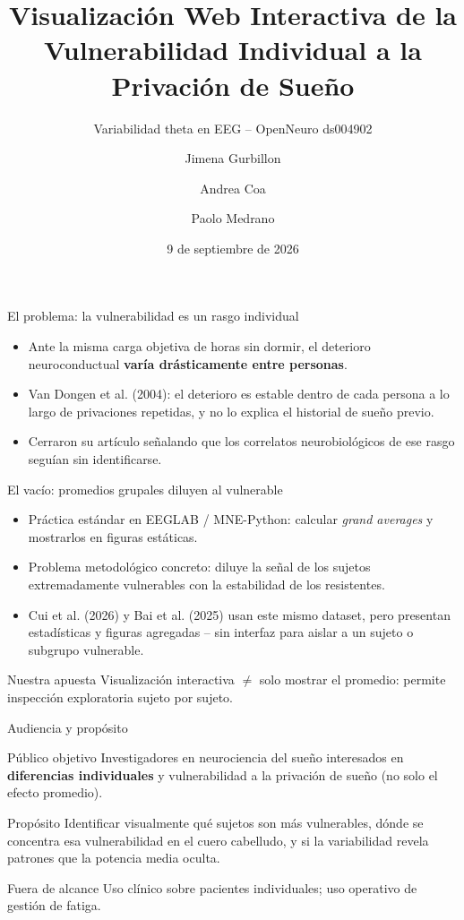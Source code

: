 \documentclass[10pt,aspectratio=169]{beamer}
\title{Visualización Web Interactiva de la Vulnerabilidad Individual a la Privación de Sueño}
\subtitle{Variabilidad theta en EEG -- OpenNeuro ds004902}
\author{Jimena Gurbillon \and Andrea Coa \and Paolo Medrano}
\institute{DS5343 -- Data Visualization, UTEC, Semestre 2026-2}
\date{9 de septiembre de 2026}
\begin{document}
\maketitle

\begin{frame}{El problema: la vulnerabilidad es un rasgo individual}
\begin{itemize}
    \item Ante la misma carga objetiva de horas sin dormir, el deterioro neuroconductual \textbf{varía drásticamente entre personas}.
    \item Van Dongen et al. (2004): el deterioro es estable dentro de cada persona a lo largo de privaciones repetidas, y no lo explica el historial de sueño previo.
    \item Cerraron su artículo señalando que los correlatos neurobiológicos de ese rasgo seguían sin identificarse.
\end{itemize}
\end{frame}

\begin{frame}{El vacío: promedios grupales diluyen al vulnerable}
\begin{itemize}
    \item Práctica estándar en EEGLAB / MNE-Python: calcular \emph{grand averages} y mostrarlos en figuras estáticas.
    \item Problema metodológico concreto: diluye la señal de los sujetos extremadamente vulnerables con la estabilidad de los resistentes.
    \item Cui et al. (2026) y Bai et al. (2025) usan este mismo dataset, pero presentan estadísticas y figuras agregadas -- sin interfaz para aislar a un sujeto o subgrupo vulnerable.
\end{itemize}
\begin{alertblock}{Nuestra apuesta}
Visualización interactiva $\neq$ solo mostrar el promedio: permite inspección exploratoria sujeto por sujeto.
\end{alertblock}
\end{frame}

\begin{frame}{Audiencia y propósito}
\begin{block}{Público objetivo}
Investigadores en neurociencia del sueño interesados en \textbf{diferencias individuales} y vulnerabilidad a la privación de sueño (no solo el efecto promedio).
\end{block}
\begin{block}{Propósito}
Identificar visualmente qué sujetos son más vulnerables, dónde se concentra esa vulnerabilidad en el cuero cabelludo, y si la variabilidad revela patrones que la potencia media oculta.
\end{block}
\begin{block}{Fuera de alcance}
Uso clínico sobre pacientes individuales; uso operativo de gestión de fatiga.
\end{block}
\end{frame}
\end{document}
